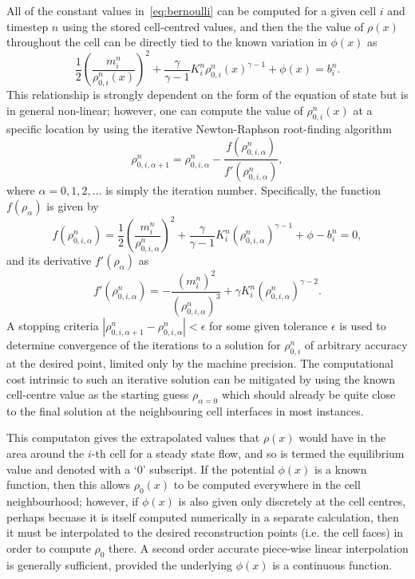 All of the constant values in~\eqref{eq:bernoulli} can be computed for a given cell $i$ and timestep $n$ using the stored cell-centred values, and then the the value of $\rho(x)$ throughout the cell can be directly tied to the known variation in $\phi(x)$ as
\begin{equation}
\frac{1}{2}\left(\frac{m_i^n}{\rho_{0,i}^n(x)}\right)^2+\frac{\gamma}{\gamma-1}K_i^n\rho_{0,i}^n(x)^{\gamma-1}+\phi(x)=b_i^n.
\end{equation}
This relationship is strongly dependent on the form of the equation of state but is in general non-linear; however, one can compute the value of $\rho_{0,i}^n(x)$ at a specific location by using the iterative Newton-Raphson root-finding algorithm
\begin{equation}
\rho_{0,i,\alpha+1}^n=\rho_{0,i,\alpha}^n-\frac{f(\rho_{0,i,\alpha}^n)}{f'(\rho_{0,i,\alpha}^n)},
\end{equation}
where $\alpha=0,1,2,...$ is simply the iteration number. Specifically, the function $f(\rho_\alpha)$ is given by
\begin{equation}
f(\rho_{0,i,\alpha}^n)=\frac{1}{2}\left(\frac{m_i^n}{\rho_{0,i,\alpha}^n}\right)^2+\frac{\gamma}{\gamma-1}K_i^n\left(\rho_{0,i,\alpha}^n\right)^{\gamma-1}+\phi-b_i^n=0,
\end{equation}
and its derivative $f'(\rho_\alpha)$ as
\begin{equation}
f'(\rho_{0,i,\alpha}^n)=-\frac{(m_i^n)^2}{\left(\rho_{0,i,\alpha}^n\right)^3}+\gamma K_i^n\left(\rho_{0,i,\alpha}^n\right)^{\gamma-2}.
\end{equation}
A stopping criteria $\left|\rho_{0,i,\alpha+1}^n-\rho_{0,i,\alpha}^n\right|<\epsilon$ for some given tolerance $\epsilon$ is used to determine convergence of the iterations to a solution for $\rho_{0,i}^n$ of arbitrary accuracy at the desired point, limited only by the machine precision. The computational cost intrinsic to such an iterative solution can be mitigated by using the known cell-centre value as the starting guess $\rho_{\alpha=0}$ which should already be quite close to the final solution at the neighbouring cell interfaces in most instances.

This computaton gives the extrapolated values that $\rho(x)$ would have in the area around the $i\textrm{-th}$ cell for a steady state flow, and so is termed the equilibrium value and denoted with a `$0$' subscript. If the potential $\phi(x)$ is a known function, then this allows $\rho_0(x)$ to be computed everywhere in the cell neighbourhood; however, if $\phi(x)$ is also given only discretely at the cell centres, perhaps becuase it is itself computed numerically in a separate calculation, then it must be interpolated to the desired reconstruction points (i.e. the cell faces) in order to compute $\rho_0$ there. A second order accurate piece-wise linear interpolation is generally sufficient, provided the underlying $\phi(x)$ is a continuous function.

